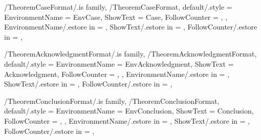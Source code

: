
\pgfkeys
{
  /TheoremCaseFormat/.is family, /TheoremCaseFormat,
  default/.style =
  {
    EnvironmentName = {EnvCase},
    ShowText = {Case},
    FollowCounter = \empty,
  },
  EnvironmentName/.estore in = \GetTheoremCaseFormatEnvironmentName,
  ShowText/.estore in = \GetTheoremCaseFormatShowText,
  FollowCounter/.estore in = \GetTheoremCaseFormatFollowCounter,
} %

\newcommand{\InsertCase}[1]
{%
  \InsertTheoremContent[\empty]{%
    \GetTheoremCaseFormatEnvironmentName}{#1}%
} %

\newcommand{\InitTheoremCaseFormat}
{%
  \ifthenelse{\equal{\GetTheoremCaseFormatFollowCounter}{\empty}}
  {%
    \newtheorem*{%
      \GetTheoremCaseFormatEnvironmentName}{%
      \GetTheoremCaseFormatShowText}
  }%
  {%
    \newtheorem{%
      \GetTheoremCaseFormatEnvironmentName}{%
      \GetTheoremCaseFormatShowText}[%
      \GetTheoremCaseFormatFollowCounter]%
  }%
} %


\pgfkeys
{
  /TheoremAcknowledgmentFormat/.is family, /TheoremAcknowledgmentFormat,
  default/.style =
  {
    EnvironmentName = {EnvAcknowledgment},
    ShowText = {Acknowledgment},
    FollowCounter = \empty,
  },
  EnvironmentName/.estore in = \GetTheoremAcknowledgmentFormatEnvironmentName,
  ShowText/.estore in = \GetTheoremAcknowledgmentFormatShowText,
  FollowCounter/.estore in = \GetTheoremAcknowledgmentFormatFollowCounter,
} %

\newcommand{\InsertAcknowledgment}[1]
{%
  \InsertTheoremContent[\empty]{%
    \GetTheoremAcknowledgmentFormatEnvironmentName}{#1}%
} %

\newcommand{\InitTheoremAcknowledgmentFormat}
{%
  \ifthenelse{\equal{\GetTheoremAcknowledgmentFormatFollowCounter}{\empty}}
  {%
    \newtheorem*{%
      \GetTheoremAcknowledgmentFormatEnvironmentName}{%
      \GetTheoremAcknowledgmentFormatShowText}
  }%
  {%
    \newtheorem{%
      \GetTheoremAcknowledgmentFormatEnvironmentName}{%
      \GetTheoremAcknowledgmentFormatShowText}[%
      \GetTheoremAcknowledgmentFormatFollowCounter]%
  }%
} %


\pgfkeys
{
  /TheoremConclusionFormat/.is family, /TheoremConclusionFormat,
  default/.style =
  {
    EnvironmentName = {EnvConclusion},
    ShowText = {Conclusion},
    FollowCounter = \empty,
  },
  EnvironmentName/.estore in = \GetTheoremConclusionFormatEnvironmentName,
  ShowText/.estore in = \GetTheoremConclusionFormatShowText,
  FollowCounter/.estore in = \GetTheoremConclusionFormatFollowCounter,
} %


